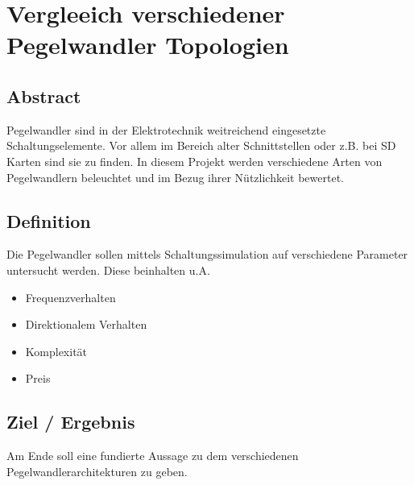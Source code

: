 \section{Vergleeich verschiedener Pegelwandler Topologien 
}\label{sec:proj-title-long}

\subsection{Abstract
}\label{subsec:proj-abstract}

Pegelwandler sind in der Elektrotechnik weitreichend eingesetzte Schaltungselemente.
Vor allem im Bereich alter Schnittstellen oder z.B. bei SD Karten sind sie zu finden.
In diesem Projekt werden verschiedene Arten von Pegelwandlern beleuchtet und im Bezug ihrer Nützlichkeit bewertet.

\subsection{Definition
}\label{subsec:proj-def}

Die Pegelwandler sollen mittels Schaltungssimulation auf verschiedene Parameter untersucht werden.
Diese beinhalten u.A. 
\begin{itemize}
  \item Frequenzverhalten
  \item Direktionalem Verhalten
  \item Komplexität
  \item Preis
\end{itemize}

\subsection{Ziel / Ergebnis
}\label{subsec:proj-target}

Am Ende soll eine fundierte Aussage zu dem verschiedenen Pegelwandlerarchitekturen zu geben.

